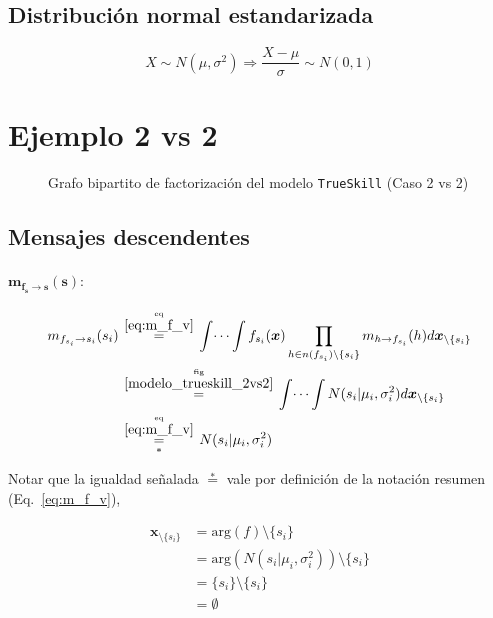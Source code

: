 \documentclass[article]{jss}
\newcommand\hfrac[2]{\genfrac{}{}{0pt}{}{#1}{#2}} %
\begin{document}
\begin{appendix}
\subsection*{Distribuci\'on normal estandarizada}
\begin{equation}\label{eq:estandarizar}
 X \sim N(\mu,\sigma^2) \Rightarrow \frac{X-\mu}{\sigma} \sim N(0,1)
\end{equation}



\section{Ejemplo 2 vs 2}

\begin{figure}[t!]
  \centering
  \scalebox{.75}{}
  \caption{\small Grafo bipartito de factorizaci\'on del modelo \texttt{TrueSkill} (Caso 2 vs 2)}
  \label{modelo_trueskill_2vs2}
\end{figure}


\subsection{Mensajes descendentes}

\paragraph{$\bm{m_{f_s \rightarrow s}(s)}:$}

\begin{equation}\label{eq:m_fs_s}
\begin{split}
 m_{f_{s_i} \rightarrow s_i}(s_i) & \overset{\hfrac{\text{eq}}{\ref{eq:m_f_v}}}{=} \int \dots \int f_{s_i}(\bm{x}) \prod_{h \in n(f_{s_i}) \setminus \{s_i\} } m_{h \rightarrow f_{s_i}}(h) d\bm{x}_{\setminus \{s_i\}}  \\
& \overset{\hfrac{\text{fig}}{\ref{modelo_trueskill_2vs2}}}{=} \int \dots \int N(s_i| \mu_i, \sigma_i^2) d\bm{x}_{\setminus \{s_i\} } \\
& \underset{*}{\overset{\hfrac{\text{eq}}{\ref{eq:m_f_v}}}{=}} N(s_i| \mu_i, \sigma_i^2)
\end{split}
\end{equation}

Notar que la igualdad se\~nalada $\overset{*}{=}$ vale por definici\'on de la notaci\'on resumen (Eq.~\ref{eq:m_f_v}),

\begin{equation*}
\begin{split}
\bm{x}_{\setminus \{s_i\} } & = \text{arg}(f) \setminus \{s_i\} \\
&= \text{arg}(N(s_i| \mu_i, \sigma_i^2)) \setminus \{s_i\} \\
&= \{s_i\} \setminus \{s_i\} \\
& = \emptyset
\end{split}
\end{equation*}




\end{appendix}
\end{document}
